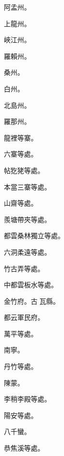 \begin{pinyinscope}
 阿孟州。



 上龍州。



 峽江州。



 羅賴州。



 桑州。



 白州。



 北島州。



 羅那州。



 龍裡等寨。



 六寨等處。



 帖犵狫等處。



 本當三寨等處。



 山齋等處。



 羨塘帶夾等處。



 都雲桑林獨立等處。



 六洞柔遠等處。



 竹古弄等處。



 中都雲板水等處。



 金竹府。古瓦縣。



 都云軍民府。



 萬平等處。



 南寧。



 丹竹等處。



 陳蒙。



 李稍李殿等處。



 陽安等處。



 八千蠻。



 恭焦溪等處。




\end{pinyinscope}
